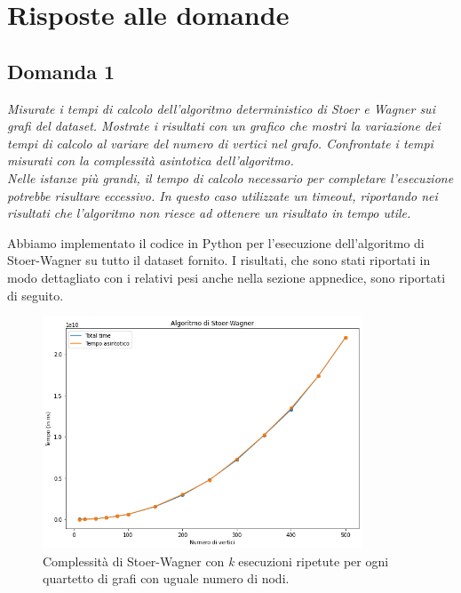 \section{Risposte alle domande}

\subsection{Domanda 1}
\textit{Misurate i tempi di calcolo dell'algoritmo deterministico di Stoer e Wagner sui grafi del dataset. Mostrate i risultati con un grafico che mostri la variazione dei tempi di calcolo al variare del numero di vertici nel grafo. Confrontate i tempi misurati con la complessità asintotica dell'algoritmo. \\
Nelle istanze più grandi, il tempo di calcolo necessario per completare l'esecuzione potrebbe risultare eccessivo. In questo caso utilizzate un timeout, riportando nei risultati che l'algoritmo non riesce ad ottenere un risultato in tempo utile.}

Abbiamo implementato il codice in Python per l'esecuzione dell'algoritmo di Stoer-Wagner su tutto il dataset fornito. I risultati, che sono stati riportati in modo dettagliato con i relativi pesi anche nella sezione appnedice, sono riportati di seguito.

\begin{figure}[H]
	\centering
	\includegraphics[width=0.85\textwidth]{res/images/single/stoerwagner}
	\caption{Complessità di Stoer-Wagner con \textit{k} esecuzioni ripetute per ogni quartetto di grafi con uguale numero di nodi.}
	\label{fig:stoerwagner}
\end{figure}

